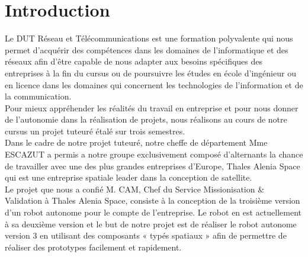 \documentclass{PackagerQualityN}
\begin{document}
\newp       %
\setcounter{tocdepth}{2}
\tableofcontents
{}





\newp
{} %
\section*{Introduction}

Le DUT Réseau et Télécommunications est une formation polyvalente qui nous permet d’acquérir des compétences dans les domaines de l’informatique et des réseaux afin d’être capable de nous adapter aux besoins spécifiques des entreprises à la fin du cursus ou de poursuivre les études en école d’ingénieur ou en licence dans les domaines qui concernent les technologies de l’information et de la communication.\\

Pour mieux appréhender les réalités du travail en entreprise et pour nous donner de l’autonomie dans la réalisation de projets, nous réalisons au cours de notre cursus un projet tuteuré étalé sur trois semestres.\\

Dans le cadre de notre projet tuteuré, notre cheffe de département Mme ESCAZUT a permis a notre groupe exclusivement composé d’alternants la chance de travailler avec une des plus grandes entreprises d’Europe, Thales Alenia Space qui est une entreprise spatiale leader dans la conception de satellite.\\

Le projet que nous a confié M. CAM, Chef du Service Missionisation \& Validation à Thales Alenia Space, consiste à la conception de la troisième version d’un robot autonome pour le compte de l’entreprise. Le robot en est actuellement à sa deuxième version et le but de notre projet est de réaliser le robot autonome version 3 en utilisant des composants « typés spatiaux » afin de permettre de réaliser des prototypes facilement et rapidement.\\
\end{document}
